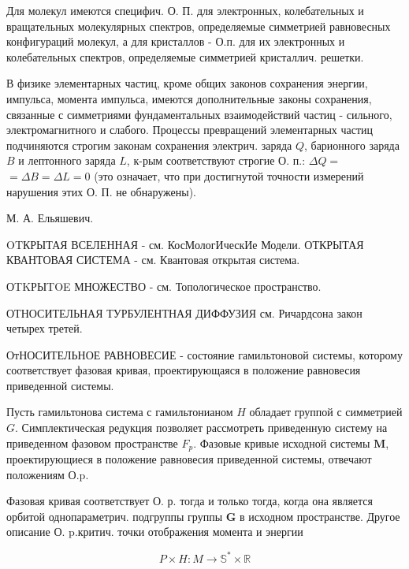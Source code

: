 \documentclass[10pt]{article}
\begin{document}
Для молекул имеются специфич. О. П. для электронных, колебательных и вращательных молекулярных спектров, определяемые симметрией равновесных конфигураций молекул, а для кристаллов - О.п. для их электронных и колебательных спектров, определяемые симметрией кристаллич. решетки.



В физике элементарных частиц, кроме общих законов сохранения энергии, импульса, момента импульса, имеются дополнительные законы сохранения, связанные с симметриями фундаментальных взаимодействий частиц - сильного, электромагнитного и слабого. Процессы превращений элементарных частиц подчиняются строгим законам сохранения электрич. заряда $Q$, барионного заряда $B$ и лептонного заряда $L$, к-рым соответствуют строгие О. п.: $\Delta Q=$ $=\Delta B=\Delta L=0$ (это означает, что при достигнутой точности измерений нарушения этих О. П. не обнаружены).



М. А. Ельяшевич.



OTКРЫТАЯ ВСЕЛЕННАЯ - см. КосМологИческИе Модели. ОТКРЫТАЯ КВАНТОВАЯ СИСТЕМА - см. Квантовая открытая система.



ОTKРЫTOE МНОЖЕСТВО - см. Топологическое пространство.



ОТНОСИТЕЛЬНАЯ ТУРБУЛЕНТНАЯ ДИФФУЗИЯ см. Ричардсона закон четырех третей.



ОтНОСИТЕЛЬНОЕ РАВНОВЕСИЕ - состояние гамильтоновой системы, которому соответствует фазовая кривая, проектирующаяся в положение равновесия приведенной системы.



Пусть гамильтонова система с гамильтонианом $H$ обладает группой с симметрией $G$. Симплектическая редукция позволяет рассмотреть приведенную систему на приведенном фазовом пространстве $F_{p}$. Фазовые кривые исходной системы $\boldsymbol{M}$, проектирующиеся в положение равновесия приведенной системы, отвечают положениям О.p.



Фазовая кривая соответствует О. р. тогда и только тогда, когда она является орбитой однопараметрич. подгруппы группы $\boldsymbol{G}$ в исходном пространстве. Другое описание О. p.критич. точки отображения момента и энергии



\[

P \times H: M \rightarrow \mathbb{S}^{*} \times \mathbb{R}

\]
\end{document}
